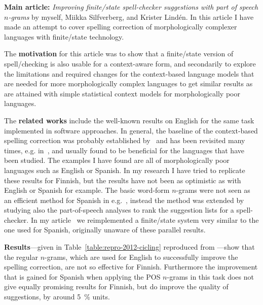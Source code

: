 \documentclass[officiallayout]{unihelcompling}
\begin{document}
\textbf{Main article:} \emph{Improving finite\-/state spell-checker suggestions
with part of speech \(n\)-grams} by myself, Miikka Silfverberg, and Krister
Lindén. In this article I have made an attempt to cover spelling correction
of morphologically complexer languages with finite\-/state technology.

The \textbf{motivation} for this article was to show that a finite\-/state
version of spell\-/checking is also usable for a context-aware form, and
secondarily to explore the limitations and required changes for the
context-based language models that are needed for more morphologically complex
languages to get similar results as are attained with simple statistical
context models for morphologically poor languages.

The \textbf{related works} include the well-known results on English for the
same task implemented in software approaches.  In general, the baseline of the
context-based spelling correction was probably established
by~\citet{mays1991context} and has been revisited many times, e.g.
in~\citet{wilcox-ohearn2008realword}, and usually found to be beneficial for
the languages that have been studied. The examples I have found are all of
morphologically poor languages such as English or Spanish. In my research I
have tried to replicate these results for Finnish, but the results have not
been as optimistic as with English or Spanish for example.  The basic word-form
\(n\)-grams were not seen as an efficient method for Spanish in
e.g.~\citet{otero2007contextual}, instead the method was extended by studying
also the part-of-speech analyses to rank the suggestion lists for a
spell-checker. In my article~ we reimplemented
a finite\-/state system very similar to the one used for Spanish, originally
unaware of these parallel results.

\textbf{Results}---given in Table~\ref{table:repro-2012-cicling} reproduced
from ---show that the regular \(n\)-grams, which
are used for English to successfully improve the spelling correction, are not
so effective for Finnish.  Furthermore the improvement that is gained for
Spanish when applying the POS \(n\)-grams in this task does not give equally
promising results for Finnish, but do improve the quality of suggestions, by
around 5~\% units.
\end{document}
